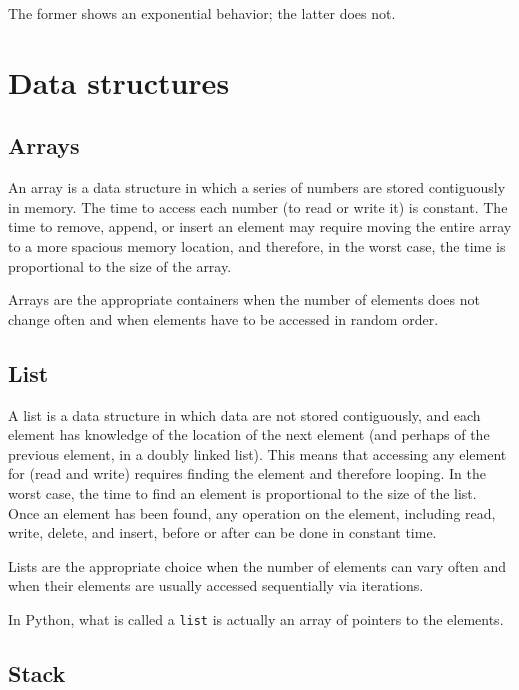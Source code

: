 \documentclass[justified, sixbynine]{tufte-book}
\def\ft{\small\tt}
\theoremstyle{plain}%
\newtheorem * {corollary}{Corollary}
\theoremstyle{definition}
\theoremstyle{remark}
\newtheorem * {remark}{Remark}
\newtheorem * {note}{Note}
\begin{document}
\begin{fullwidth}
The former shows an exponential behavior; the latter does not.

\goodbreak\section{Data structures}

\goodbreak\subsection{Arrays}

An array is a data structure in which a series of numbers are stored contiguously in memory. The time to access each number (to read or write it) is constant. The time to remove, append, or insert an element may require moving the entire array to a more spacious memory location, and therefore, in the worst case, the time is proportional to the size of the array.

Arrays are the appropriate containers when the number of elements does not change often and when elements have to be accessed in random order.

\goodbreak\subsection{List}

A list is a data structure in which data are not stored contiguously, and each element has knowledge of the location of the next element (and perhaps of the previous element, in a doubly linked list). This means that accessing any element for (read and write) requires finding the element and therefore looping. In the worst case, the time to find an element is proportional to the size of the list. Once an element has been found, any operation on the element, including read, write, delete, and insert, before or after can be done in constant time.

Lists are the appropriate choice when the number of elements can vary often and when their elements are usually accessed sequentially via iterations.

In Python, what is called a {\ft list} is actually an array of pointers to the elements.

\goodbreak\subsection{Stack}



\end{fullwidth}
\end{document}
